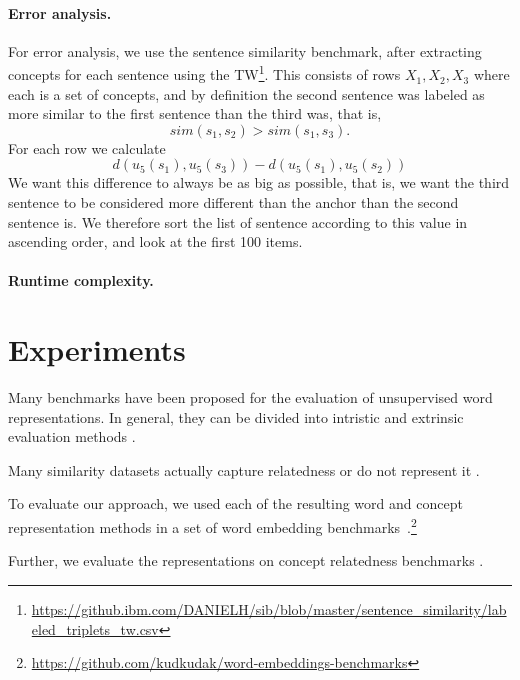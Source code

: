 \documentclass{article}
\begin{document}
    \paragraph{Error analysis.}
    For error analysis, we use the sentence similarity benchmark,
    after extracting concepts for each sentence using the
    TW\footnote{\url{https://github.ibm.com/DANIELH/sib/blob/master/sentence_similarity/labeled_triplets_tw.csv}}.
    This consists of rows $X_1,X_2,X_3$ where each is a set of concepts,
    and by definition the second sentence was labeled as more similar to the first
    sentence than the third was, that is,
    \[
        sim(s_1,s_2)>sim(s_1,s_3).
    \]
    For each row we calculate
    \[
        d(u_5(s_1),u_5(s_3)) - d(u_5(s_1),u_5(s_2))
    \]
    We want this difference to always be as big as possible,
    that is, we want the third sentence to be considered more different than
    the anchor than the second sentence is.
    We therefore sort the list of sentence according to this value
    in ascending order, and look at the first 100 items.

    \paragraph{Runtime complexity.}



    \section{Experiments}\label{sec:experiments}

    Many benchmarks have been proposed for the evaluation of unsupervised word
    representations.
    In general, they can be divided into intristic and extrinsic evaluation methods \cite{schnabel2015evaluation,jastrzebski2017evaluate,alshargi2018concept2vec,bakarov2018survey}.

    Many similarity datasets actually capture relatedness or do not represent it \cite{hill2015simlex,avraham2016improving}.

    To evaluate our approach, we used each of the resulting word and concept
    representation methods in a set of word embedding benchmarks~\cite{jastrzebski2017evaluate}.\footnote{\url{https://github.com/kudkudak/word-embeddings-benchmarks}}
    
    Further, we evaluate the representations on concept relatedness benchmarks
\cite{levy2015tr9856,eindor2018semantic}.
    
\end{document}
